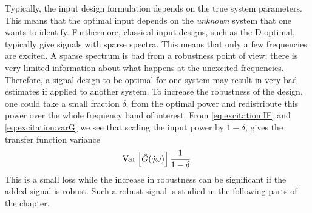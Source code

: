 Typically, the input design formulation depends on the true system parameters. This means that the optimal input depends on the \emph{unknown} system that one wants to identify. Furthermore, classical input designs, such as the D-optimal, typically give signals with sparse spectra. This means that only a few frequencies are excited. A sparse spectrum is bad from a robustness point of view; there is very limited information about what happens at the unexcited frequencies. Therefore, a signal design to be optimal for one system may result in very bad estimates if applied to another system. 
To increase the robustness of the design, one could take a small fraction $\delta$, from the optimal power and redistribute this power over the whole frequency band of interest.
From \eqref{eq:excitation:IF} and \eqref{eq:excitation:varG} we see that scaling the input power by $1-\delta$, gives the transfer function variance
\begin{align}
\operatorname{\mathrm{Var}}_{} \left[ \hat{G}(j\omega) \right]\frac{1}{1-\delta}.
\end{align}
This is a small loss while the increase in robustness can be significant if the added signal is robust. Such a robust signal is studied in the following parts of the chapter.


